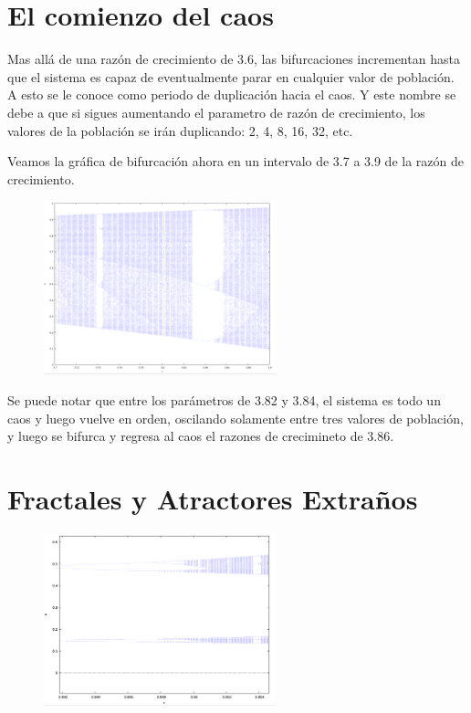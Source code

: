 \documentclass[a4paper]{article}
\begin{document}
\section{El comienzo del caos}

Mas allá de una razón de crecimiento de 3.6, las bifurcaciones incrementan hasta que el sistema es capaz de eventualmente parar en cualquier valor de población. A esto se le conoce como periodo de duplicación hacia el caos. Y este nombre se debe a que si sigues aumentando el parametro de razón de crecimiento, los valores de la población se irán duplicando: 2, 4, 8, 16, 32, etc. 

Veamos la gráfica de bifurcación ahora en un intervalo de 3.7 a 3.9 de la razón de crecimiento. 

\begin{figure}[ht!]
\centering
\includegraphics[width=0.6\textwidth]{Bifurcation3.png}
\end{figure}

Se puede notar que entre los parámetros de 3.82 y 3.84, el sistema es todo un caos y luego vuelve en orden, oscilando solamente entre tres valores de población, y luego se bifurca y regresa al caos el razones de crecimineto de 3.86.

\newpage
\section{Fractales y Atractores Extraños}


\begin{figure}[ht!]
\centering
\includegraphics[width=0.6\textwidth]{Bifurcation4.png}
\end{figure}
\end{document}
